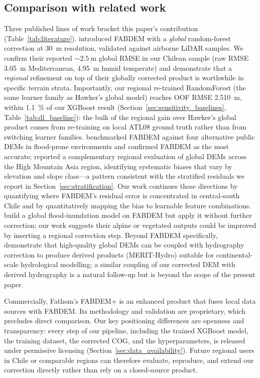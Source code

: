 \documentclass[preprint,authoryear,number]{elsarticle}
\begin{document}
\subsection{Comparison with related work}
\label{sec:related_work}

Three published lines of work bracket this paper's contribution (Table~\ref{tab:literature}). \citet{Hawker2022FABDEM} introduced FABDEM with a \emph{global} random-forest correction at \SI{30}{\meter} resolution, validated against airborne LiDAR samples. We confirm their reported $\sim\SI{2.5}{\meter}$ global RMSE in our Chilean sample (raw RMSE \SI{3.05}{\meter} Mediterranean, \SI{4.95}{\meter} humid temperate) and demonstrate that a \emph{regional} refinement on top of their globally corrected product is worthwhile in specific terrain strata. Importantly, our regional re-trained RandomForest (the same learner family as Hawker's global model) reaches OOF RMSE \SI{2.510}{\meter}, within \SI{1.1}{\percent} of our XGBoost result (Section~\ref{sec:sensitivity_baselines}, Table~\ref{tab:dl_baseline}): the bulk of the regional gain over Hawker's global product comes from re-training on local ATL08 ground truth rather than from switching learner families. \citet{Meadows2024VerticalAccuracy} benchmarked FABDEM against four alternative public DEMs in flood-prone environments and confirmed FABDEM as the most accurate; \citet{Liu2023FABDEMChina} reported a complementary regional evaluation of global DEMs across the High Mountain Asia region, identifying systematic biases that vary by elevation and slope class---a pattern consistent with the stratified residuals we report in Section~\ref{sec:stratification}. Our work continues these directions by quantifying where FABDEM's residual error is concentrated in central-south Chile and by quantitatively mapping the bias to learnable feature combinations. \citet{Wing2024GlobalFlood} build a global flood-inundation model on FABDEM but apply it without further correction; our work suggests their alpine or vegetated outputs could be improved by inserting a regional correction step. Beyond FABDEM specifically, \citet{Yamazaki2019MERITHydro} demonstrate that high-quality global DEMs can be coupled with hydrography correction to produce derived products (MERIT-Hydro) suitable for continental-scale hydrological modelling; a similar coupling of our corrected DEM with derived hydrography is a natural follow-up but is beyond the scope of the present paper.



Commercially, Fathom's FABDEM+ \citep{Fathom2024FABDEMPlus} is an enhanced product that fuses local data sources with FABDEM. Its methodology and validation are proprietary, which precludes direct comparison. Our key positioning differences are openness and transparency: every step of our pipeline, including the trained XGBoost model, the training dataset, the corrected COG, and the hyperparameters, is released under permissive licensing (Section~\ref{sec:data_availability}). Future regional users in Chile or comparable regions can therefore evaluate, reproduce, and extend our correction directly rather than rely on a closed-source product.
\end{document}
